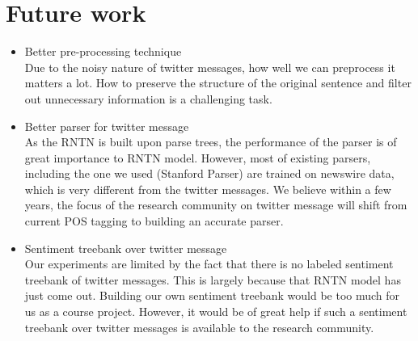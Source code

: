 \section{Future work}
\label{sec:future}
\begin{itemize}
\addtolength{\itemsep}{-0.5\baselineskip}

\item Better pre-processing technique \\
Due to the noisy nature of twitter messages, how well we can preprocess it matters a lot. How to preserve the structure of the original sentence and filter out unnecessary information is a challenging task. 

\item Better parser for twitter message \\
As the RNTN is built upon parse trees, the performance of the parser is of great importance to RNTN model. However, most of existing parsers, including the one we used (Stanford Parser) are trained on newswire data, which is very different from the twitter messages. We believe within a few years, the focus of the research community on twitter message will shift from current POS tagging to building an accurate parser. 

\item Sentiment treebank over twitter message \\
Our experiments are limited by the fact that there is no labeled sentiment treebank of twitter messages. This is largely because that RNTN model has just come out. Building our own sentiment treebank would be too much for us as a course project. However, it would be of great help if such a sentiment treebank over twitter messages is available to the research community. 


\end{itemize}


